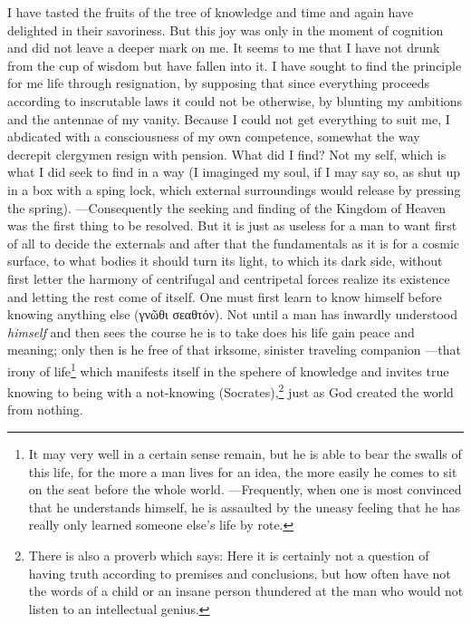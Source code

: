  I have tasted the fruits of the tree of knowledge and time and again have delighted in their savoriness. 
 But this joy was only in the moment of cognition and did not leave a deeper mark on me. 
 It seems to me that I have not drunk from the cup of wisdom but have fallen into it. 
 I have sought to find the principle for me life through resignation, by supposing that since everything proceeds according to inscrutable laws it could not be otherwise, by blunting my ambitions and the antennae of my vanity. 
 Because I could not get everything to suit me, I abdicated with a consciousness of my own competence, somewhat the way decrepit clergymen resign with pension. 
 What did I find? 
 Not my self, which is what I did seek to find in a way (I imaginged my soul, if I may say so, as shut up in a box with a sping lock, which external surroundings would release by pressing the spring). 
 ---Consequently the seeking and finding of the Kingdom of Heaven was the first thing to be resolved. 
 But it is just as useless for a man to want first of all to decide the externals and after that the fundamentals as it is for a cosmic surface, to what bodies it should turn its light, to which its dark side, without first letter the harmony of centrifugal and centripetal forces realize its existence and letting the rest come of itself. 
 One must first learn to know himself before knowing anything else  (γνῶθι σεαθτόν).  
 Not until a man has inwardly understood \textit{himself} and then sees the course he is to take does his life gain peace and meaning; only then is he free of that irksome, sinister traveling companion ---that irony of life\footnote{
   It may very well in a certain sense remain, but he is able to bear the swalls of this life, for the more a man lives for an idea, the more easily he comes to sit on the  seat before the whole world. 
   ---Frequently, when one is most convinced that he understands himself, he is assaulted by the uneasy feeling that he has really only learned someone else's life by rote. 
 }
   which manifests itself in the spehere of knowledge and invites true knowing to being with a not-knowing (Socrates),\footnote{
   There is also a proverb which says:  
   Here it is certainly not a question of having truth according to premises and conclusions, but how often have not the words of a child or an insane person thundered at the man who would not listen to an intellectual genius. 
 }
   just as God created the world from nothing. 
